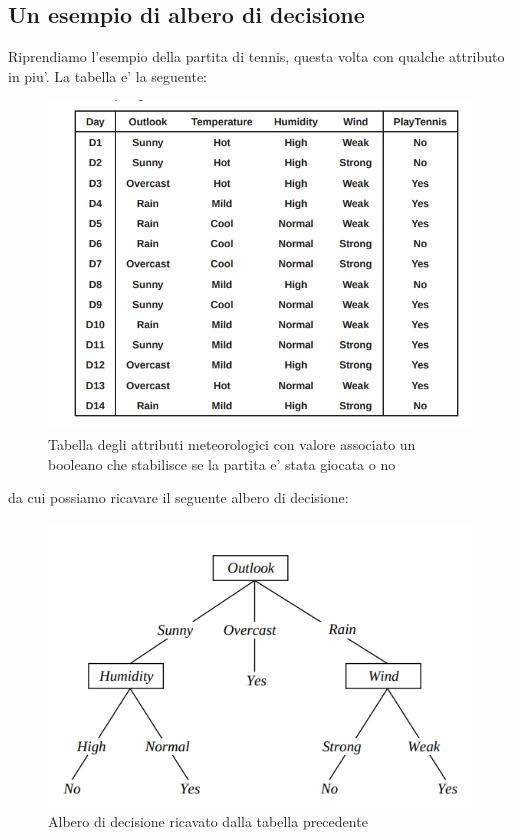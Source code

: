 \subsection*{Un esempio di albero di decisione}
Riprendiamo l'esempio della partita di tennis, questa volta con qualche attributo in piu'. La tabella e' la seguente:
\begin{figure}[H]
	\centering
	\includegraphics[width=0.7\linewidth]{img/decision-_tree_table_tennis}
	\caption{Tabella degli attributi meteorologici con valore associato un booleano che stabilisce se la partita e' stata giocata o no}
	\label{fig:decision-treetabletennis}
\end{figure}
da cui possiamo ricavare il seguente albero di decisione:
\begin{figure}[H]
	\centering
	\includegraphics[width=0.7\linewidth]{img/decision_tree_tree_tennis}
	\caption{Albero di decisione ricavato dalla tabella precedente}
	\label{fig:decisiontreetreetennis}
\end{figure}


